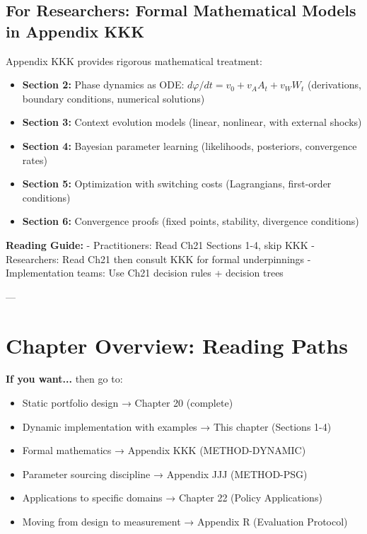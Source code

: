 \subsection{For Researchers: Formal Mathematical Models in Appendix KKK}

Appendix KKK provides rigorous mathematical treatment:

\begin{itemize}[nosep]
\item \textbf{Section 2:} Phase dynamics as ODE: $d\varphi/dt = v_0 + v_A A_t + v_W W_t$ (derivations, boundary conditions, numerical solutions)
\item \textbf{Section 3:} Context evolution models (linear, nonlinear, with external shocks)
\item \textbf{Section 4:} Bayesian parameter learning (likelihoods, posteriors, convergence rates)
\item \textbf{Section 5:} Optimization with switching costs (Lagrangians, first-order conditions)
\item \textbf{Section 6:} Convergence proofs (fixed points, stability, divergence conditions)
\end{itemize}

\textbf{Reading Guide:}
- Practitioners: Read Ch21 Sections 1-4, skip KKK
- Researchers: Read Ch21 then consult KKK for formal underpinnings
- Implementation teams: Use Ch21 decision rules + decision trees

---

\section{Chapter Overview: Reading Paths}
\label{sec:21-reading-paths}

\begin{tcolorbox}[colback=yellow!5!white, colframe=yellow!75!black, title=Where to Go Next]

\textbf{If you want...} then go to:
\begin{itemize}[nosep]
\item Static portfolio design → Chapter 20 (complete)
\item Dynamic implementation with examples → This chapter (Sections 1-4)
\item Formal mathematics → Appendix KKK (METHOD-DYNAMIC)
\item Parameter sourcing discipline → Appendix JJJ (METHOD-PSG)
\item Applications to specific domains → Chapter 22 (Policy Applications)
\item Moving from design to measurement → Appendix R (Evaluation Protocol)
\end{itemize}

\end{tcolorbox}

